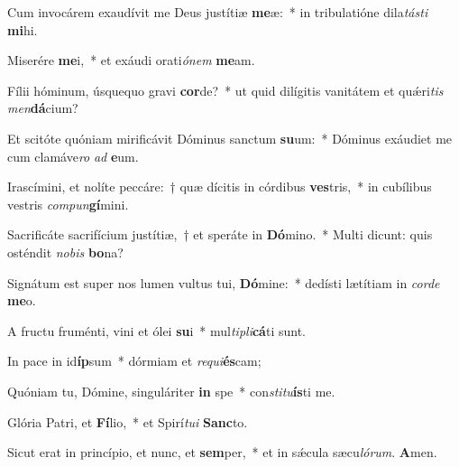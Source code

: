 \item Cum invocárem exaudívit me Deus justítiæ \textbf{me}æ:~* in tribulatióne dila\textit{tásti} \textbf{mi}hi.

\item Miserére \textbf{me}i,~* et exáudi orati\textit{ónem} \textbf{me}am.

\item Fílii hóminum, úsquequo gravi \textbf{cor}de?~* ut quid dilígitis vanitátem et quǽri\textit{tis} \textit{men}\textbf{dá}cium?

\item Et scitóte quóniam mirificávit Dóminus sanctum \textbf{su}um:~* Dóminus exáudiet me cum clamáve\textit{ro} \textit{ad} \textbf{e}um.

\item Irascímini, et nolíte peccáre:~† quæ dícitis in córdibus \textbf{ves}tris,~* in cubílibus vestris \textit{compun}\textbf{gí}mini.

\item Sacrificáte sacrifícium justítiæ,~† et speráte in \textbf{Dó}mino.~* Multi dicunt: quis osténdit \textit{nobis} \textbf{bo}na?

\item Signátum est super nos lumen vultus tui, \textbf{Dó}mine:~* dedísti lætítiam in \textit{corde} \textbf{me}o.

\item A fructu fruménti, vini et ólei \textbf{su}i~* mul\textit{tipli}\textbf{cá}ti sunt.

\item In pace in id\textbf{íp}sum~* dórmiam et \textit{requi}\textbf{és}cam;

\item Quóniam tu, Dómine, singuláriter \textbf{in} spe~* con\textit{stitu}\textbf{ís}ti me.

\item Glória Patri, et \textbf{Fí}lio,~* et Spirí\textit{tui} \textbf{Sanc}to.

\item Sicut erat in princípio, et nunc, et \textbf{sem}per,~* et in sǽcula sæcu\textit{lórum}. \textbf{A}men.